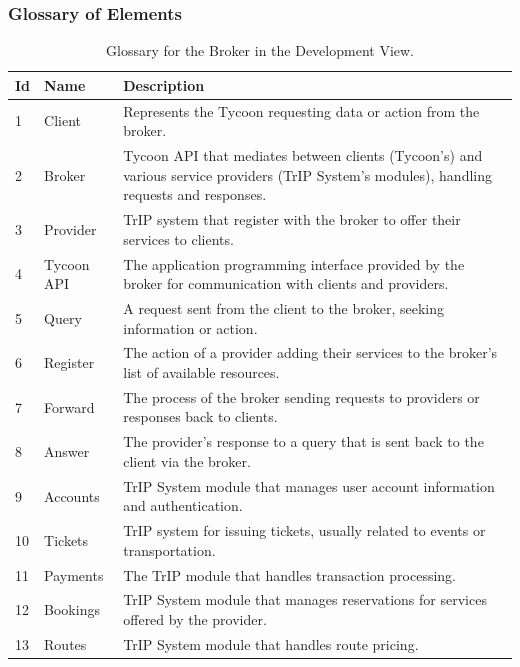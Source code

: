 \subsubsection{Glossary of Elements}

\begin{table}[H]
    \centering
    \caption{Glossary for the Broker in the Development View.}
    \label{tab:broker_development_glossary}
    \begin{tabular}{@{}llp{10cm}@{}}
        \toprule
    \textbf{Id} & \textbf{Name} & \textbf{Description} \\
    \midrule
    1 & Client & Represents the Tycoon requesting data or action from the broker. \\
    2 & Broker & Tycoon API that mediates between clients (Tycoon's) and various service providers (TrIP System's modules), handling requests and responses. \\
    3 & Provider & TrIP system that register with the broker to offer their services to clients. \\
    4 & Tycoon API & The application programming interface provided by the broker for communication with clients and providers. \\
    5 & Query & A request sent from the client to the broker, seeking information or action. \\
    6 & Register & The action of a provider adding their services to the broker's list of available resources. \\
    7 & Forward & The process of the broker sending requests to providers or responses back to clients. \\
    8 & Answer & The provider's response to a query that is sent back to the client via the broker. \\
    9 & Accounts & TrIP System module that manages user account information and authentication. \\
    10 & Tickets & TrIP system for issuing tickets, usually related to events or transportation. \\
    11 & Payments & The TrIP module that handles transaction processing. \\
    12 & Bookings & TrIP System module that manages reservations for services offered by the provider. \\
    13 & Routes & TrIP System module that handles route pricing. \\
    \bottomrule
    \end{tabular}
\end{table}
